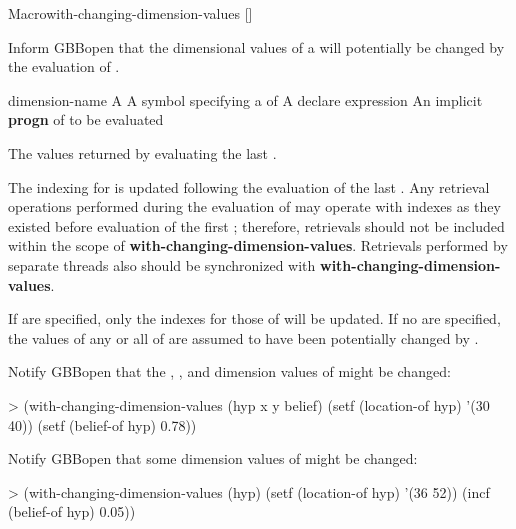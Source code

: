\documentclass[10pt,twoside,english,pdftex]{article}
\begin{document}
\begin{functiondoc}{Macro}{with-changing-dimension-values}%
  {\code{(} 
         [\superstar{}]\code{)}
    \superstar{}
    \superstar{}
    \returns{} \superstar}
%
  
\fnsyntax

\fnpurpose Inform GBBopen that the dimensional values of a
 will potentially be changed by the evaluation of
.

\fnpackage {}

\fnmodule {}

\fnargs
\begin{args}{dimension-name}
 A 
 A symbol specifying a  of
\arg[declaration] A declare expression
\arg[forms] An implicit \textbf{progn} of  to be evaluated
\end{args}

\fnreturns The values returned by evaluating the last .

\fndescription The indexing for  is updated following the
evaluation of the last .  Any retrieval operations performed during
the evaluation of  may operate with indexes as they existed
before evaluation of the first ; therefore, retrievals should not be
included within the scope of \textbf{with-changing-dimension-values}.
Retrievals performed by separate threads also should be synchronized with
\textbf{with-changing-dimension-values}.

If  are specified, only the indexes for those
 of  will be updated. If no
 are specified, the values of any or all
 of  are assumed to have been
potentially changed by .

\fnexamples Notify GBBopen that the , , and 
dimension values of  might be changed:
\begin{example}
> (with-changing-dimension-values (hyp x y belief)
    (setf (location-of hyp) '(30 40))
    (setf (belief-of hyp) 0.78))
\end{example}

Notify GBBopen that some dimension values of  might be changed:
\begin{example}
> (with-changing-dimension-values (hyp)
    (setf (location-of hyp) '(36 52))
    (incf (belief-of hyp) 0.05))
\end{example}

\end{functiondoc}
\end{document}
